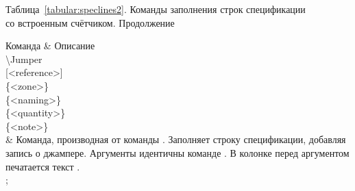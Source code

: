 \clearpage

\begin{tikztablex}
{
\caption*{Таблица~\ref{tabular:speclines2}. Команды заполнения строк спецификации\\
со встроенным счётчиком. Продолжение}
}
{
Команда & Описание\\
{\textbackslash{}Jumper\\[0pt][<reference>]\\
\{<zone>\}\\
\{<naming>\}\\
\{<quantity>\}\\
\{<note>\}\\}
&
Команда, производная от команды . Заполняет строку
спецификации, добавляя запись о джампере. Аргументы идентичны команде
. В колонке  перед
аргументом  печатается текст .\\
};
\end{tikztablex}

\clearpage
